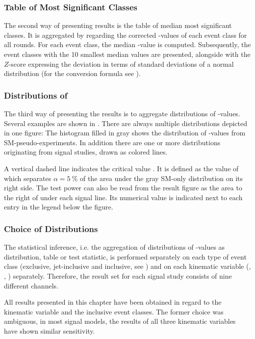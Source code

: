 \subsubsection{Table of Most Significant Classes}
The second way of presenting results is the table of median most significant classes. It is aggregated by regarding the corrected \ptilde-values of each event class for all rounds. For each event class, the median \ptilde-value is computed. Subsequently, the event classes with the \num{10} smallest median values are presented, alongside with the $Z$-score expressing the deviation in terms of standard deviations of a normal distribution (for the conversion formula see ). 

\subsubsection{Distributions of \TSphat}
The third way of presenting the results is to aggregate distributions of \TSphat-values. Several examples are shown in . There are always multiple distributions depicted in one figure: The histogram filled in gray shows the distribution of \TSphat-values from \ac{SM}-pseudo-experiments. In addition there are one or more distributions originating from signal studies, drawn as colored lines. 

A vertical dashed line indicates the critical value \TSphatcrit. It is defined as the value of \TSphat which separates $\alpha = \SI{5}{\percent}$ of the area under the gray \ac{SM}-only distribution on its right side. The test power can also be read from the result figure as the area to the right of \TSphatcrit under each signal line. Its numerical value is indicated next to each entry in the legend below the figure.

\subsubsection{Choice of Distributions}
The statistical inference, i.e. the aggregation of distributions of \ptilde-values as distribution, table or test statistic, is performed separately on each type of event class (exclusive, jet-inclusive and inclusive, see ) and on each kinematic variable (\Minv, \sumpT, \MET) separately. Therefore, the result set for each signal study consists of nine different channels.

All results presented in this chapter have been obtained in regard to the \sumpT kinematic variable and the inclusive event classes. The former choice was ambiguous, in most signal models, the results of all three kinematic variables have shown similar sensitivity. 

